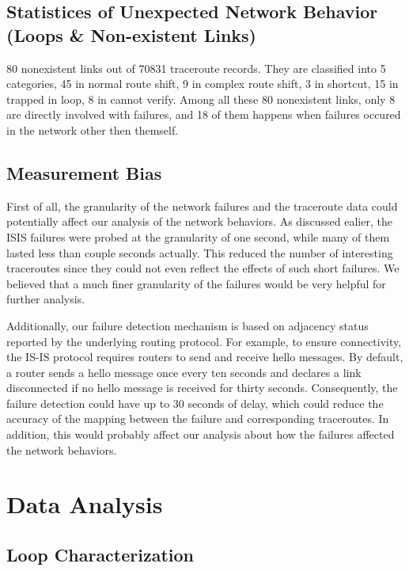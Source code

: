 \documentclass[conference, twocolumn, oneside, 10pt]{IEEEtran}
\begin{document}
\subsection{Statistices of Unexpected Network Behavior (Loops \& Non-existent Links)}
80 nonexistent links out of 70831 traceroute records. They are classified into 5 categories,  45 in normal route shift, 9 in complex route shift, 3 in shortcut, 15 in trapped in loop, 8 in cannot verify. Among all these 80 nonexistent links, only 8 are directly involved with failures, and 18 of them happens when failures occured in the network other then themself. 

\subsection{Measurement Bias}

First of all, the granularity of the network failures and the traceroute data could potentially affect our analysis of the network behaviors. As discussed ealier, the ISIS failures were probed at the granularity of one second, while many of them lasted less than couple seconds actually. This reduced the number of interesting traceroutes since they could not even reflect the effects of such short failures. We believed that a much finer granularity of the failures would be very helpful for further analysis.

Additionally, our failure detection mechanism is based on adjacency status reported by the underlying routing protocol. For example, to ensure connectivity, the IS-IS protocol requires routers to send and
receive hello messages. By default, a router sends a hello message once every ten seconds and declares a link disconnected if no hello message is received for thirty seconds. Consequently, the failure detection could have up to 30 seconds of delay, which could reduce the accuracy of the mapping between the failure and corresponding traceroutes. In addition, this would probably affect our analysis about how the failures affected the network behaviors.

\section{Data Analysis}
\label{sec:sec6}

\subsection{Loop Characterization}
 
\end{document}
